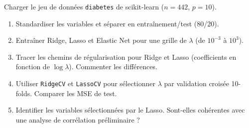 \begin{exercice}
Charger le jeu de donn\'ees \texttt{diabetes} de scikit-learn ($n = 442$, $p = 10$).
\begin{enumerate}
  \item Standardiser les variables et s\'eparer en entra\^inement/test (80/20).
  \item Entra\^iner Ridge, Lasso et Elastic Net pour une grille de $\lambda$
        (de $10^{-3}$ \`a $10^3$).
  \item Tracer les chemins de r\'egularisation pour Ridge et Lasso (coefficients
        en fonction de $\log\lambda$). Commenter les diff\'erences.
  \item Utiliser \texttt{RidgeCV} et \texttt{LassoCV} pour s\'electionner $\lambda$
        par validation crois\'ee 10-folds. Comparer les MSE de test.
  \item Identifier les variables s\'electionn\'ees par le Lasso. Sont-elles
        coh\'erentes avec une analyse de corr\'elation pr\'eliminaire ?
\end{enumerate}
\end{exercice}

